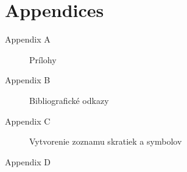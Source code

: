 \section*{Appendices}
\thispagestyle{empty}

\begin{description}
	\item[Appendix A] Prílohy
	\item[Appendix B] Bibliografické odkazy
	\item[Appendix C] Vytvorenie zoznamu skratiek a symbolov
	\item[Appendix D] 
\end{description}